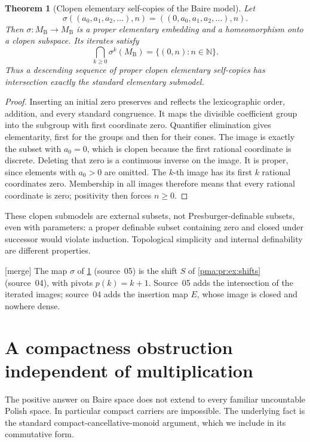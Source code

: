 \documentclass[11pt]{article}
\numberwithin{equation}{section}
\newtheorem{theorem}{Theorem}[section]
\theoremstyle{definition}
\theoremstyle{remark}
\newcommand{\N}{\mathbb N}
\newcommand{\MB}{M_{\mathrm B}}
\newcommand{\mergetag}{\textup{\textsf{\small[merge]}}}
\begin{document}
\begin{theorem}[Clopen elementary self-copies of the Baire model]
\label{pma:pr:thm:shift}
Let
\[
 \sigma((a_0,a_1,a_2,\ldots),n)
   =((0,a_0,a_1,a_2,\ldots),n).
\]
Then $\sigma:\MB\to\MB$ is a proper elementary embedding and a
homeomorphism onto a clopen subspace. Its iterates satisfy
\[
 \bigcap_{k\geq0}\sigma^k(\MB)=\{(0,n):n\in\N\}.
\]
Thus a descending sequence of proper clopen elementary self-copies has
intersection exactly the standard elementary submodel.
\end{theorem}
\begin{proof}
Inserting an initial zero preserves and reflects the lexicographic
order, addition, and every standard congruence. It maps the divisible
coefficient group into the subgroup with first coordinate zero.
Quantifier elimination gives elementarity, first for the groups and
then for their cones. The image is exactly the subset with $a_0=0$,
which is clopen because the first rational coordinate is discrete.
Deleting that zero is a continuous inverse on the image. It is proper,
since elements with $a_0>0$ are omitted.
The $k$-th image has its first $k$ rational coordinates zero. Membership
in all images therefore means that every rational coordinate is zero;
positivity then forces $n\geq0$.
\end{proof}

These clopen submodels are external subsets, not Presburger-definable
subsets, even with parameters: a proper definable subset containing zero
and closed under successor would violate induction. Topological
simplicity and internal definability are different properties.

\noindent\mergetag{} The map $\sigma$ of \cref{pma:pr:thm:shift} (source~05)
is the shift $S$ of \cref{pma:pr:ex:shifts} (source~04), with pivots
$p(k)=k+1$. Source~05 adds the intersection of the iterated images; source~04
adds the insertion map $E$, whose image is closed and nowhere dense.

\section{A compactness obstruction independent of multiplication}
\label{pma:pr:sec:compact}

The positive answer on Baire space does not extend to every familiar
uncountable Polish space. In particular compact carriers are impossible.
The underlying fact is the standard compact-cancellative-monoid argument,
which we include in its commutative form.
\end{document}

